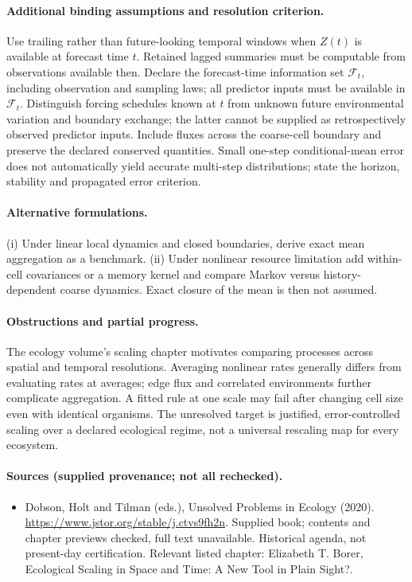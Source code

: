 \documentclass[11pt]{article}
\begin{document}
\paragraph{Additional binding assumptions and resolution criterion.} Use trailing rather than future-looking temporal windows when $Z(t)$ is available at forecast time $t$. Retained lagged summaries must be computable from observations available then. Declare the forecast-time information set $\mathcal F_t$, including observation and sampling laws; all predictor inputs must be available in $\mathcal F_t$. Distinguish forcing schedules known at $t$ from unknown future environmental variation and boundary exchange; the latter cannot be supplied as retrospectively observed predictor inputs. Include fluxes across the coarse-cell boundary and preserve the declared conserved quantities. Small one-step conditional-mean error does not automatically yield accurate multi-step distributions; state the horizon, stability and propagated error criterion.

\paragraph{Alternative formulations.} (i) Under linear local dynamics and closed boundaries, derive exact mean aggregation as a benchmark. (ii) Under nonlinear resource limitation add within-cell covariances or a memory kernel and compare Markov versus history-dependent coarse dynamics. Exact closure of the mean is then not assumed.
\paragraph{Obstructions and partial progress.} The ecology volume's scaling chapter motivates comparing processes across spatial and temporal resolutions. Averaging nonlinear rates generally differs from evaluating rates at averages; edge flux and correlated environments further complicate aggregation. A fitted rule at one scale may fail after changing cell size even with identical organisms. The unresolved target is justified, error-controlled scaling over a declared ecological regime, not a universal rescaling map for every ecosystem.
\paragraph{Sources (supplied provenance; not all rechecked).}
\begin{itemize}
\item Dobson, Holt and Tilman (eds.), Unsolved Problems in Ecology (2020). \url{https://www.jstor.org/stable/j.ctvs9fh2n}. Supplied book; contents and chapter previews checked, full text unavailable. Historical agenda, not present-day certification. Relevant listed chapter: Elizabeth T. Borer, Ecological Scaling in Space and Time: A New Tool in Plain Sight?.
\end{itemize}
\end{document}
